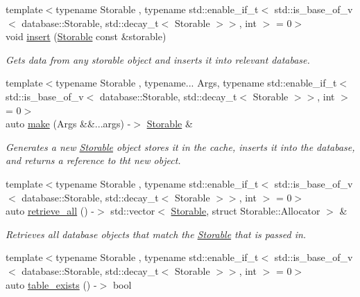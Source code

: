 \begin{DoxyCompactItemize}
{\footnotesize template$<$typename Storable , typename std\+::enable\+\_\+if\+\_\+t$<$ std\+::is\+\_\+base\+\_\+of\+\_\+v$<$ database\+::\+Storable, std\+::decay\+\_\+t$<$ Storable $>$$>$, int $>$  = 0$>$ }\\void \hyperlink{namespacedatabase_1_1utils_ab9b80f05cca7a094baf577ec5b62108c}{insert} (\hyperlink{classdatabase_1_1_storable}{Storable} const \&storable)
\begin{DoxyCompactList}\small\item\em Gets data from any storable object and inserts it into relevant database. \end{DoxyCompactList}\item 
{\footnotesize template$<$typename Storable , typename... Args, typename std\+::enable\+\_\+if\+\_\+t$<$ std\+::is\+\_\+base\+\_\+of\+\_\+v$<$ database\+::\+Storable, std\+::decay\+\_\+t$<$ Storable $>$$>$, int $>$  = 0$>$ }\\auto \hyperlink{namespacedatabase_1_1utils_a8d10f5dbf82b7d8008d8d82865c5a19a}{make} (Args \&\&...args) -\/$>$ \hyperlink{classdatabase_1_1_storable}{Storable} \&
\begin{DoxyCompactList}\small\item\em Generates a new \hyperlink{classdatabase_1_1_storable}{Storable} object stores it in the cache, inserts it into the database, and returns a reference to tht new object. \end{DoxyCompactList}\item 
{\footnotesize template$<$typename Storable , typename std\+::enable\+\_\+if\+\_\+t$<$ std\+::is\+\_\+base\+\_\+of\+\_\+v$<$ database\+::\+Storable, std\+::decay\+\_\+t$<$ Storable $>$$>$, int $>$  = 0$>$ }\\auto \hyperlink{namespacedatabase_1_1utils_a41142b70272ad4b4ec442a28dc5c8ce3}{retrieve\+\_\+all} () -\/$>$ std\+::vector$<$ \hyperlink{classdatabase_1_1_storable}{Storable}, struct Storable\+::\+Allocator $>$ \&
\begin{DoxyCompactList}\small\item\em Retrieves all database objects that match the \hyperlink{classdatabase_1_1_storable}{Storable} that is passed in. \end{DoxyCompactList}\item 
{\footnotesize template$<$typename Storable , typename std\+::enable\+\_\+if\+\_\+t$<$ std\+::is\+\_\+base\+\_\+of\+\_\+v$<$ database\+::\+Storable, std\+::decay\+\_\+t$<$ Storable $>$$>$, int $>$  = 0$>$ }\\auto \hyperlink{namespacedatabase_1_1utils_a3c5ce09d7fc593c4395d40fe5c1a0630}{table\+\_\+exists} () -\/$>$ bool

\end{DoxyCompactItemize}
